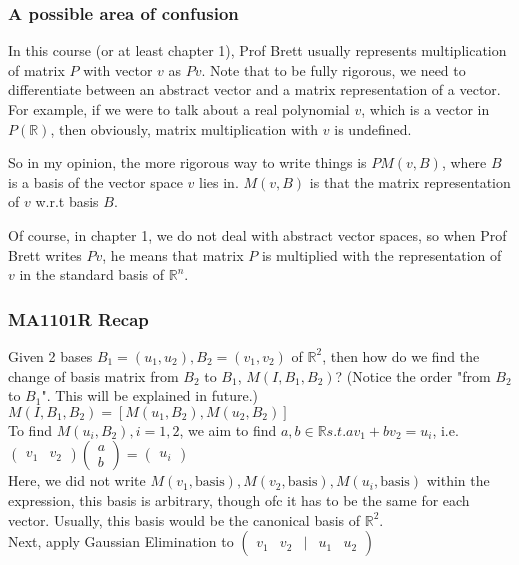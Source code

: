 \documentclass{article}
\begin{document}
\subsubsection{A possible area of confusion}
In this course (or at least chapter 1), Prof Brett usually represents multiplication of matrix $P$ with vector $v$ as $Pv$. Note that to be fully rigorous, we need to differentiate between an abstract vector and a matrix representation of a vector. For example, if we were to talk about a real polynomial $v$, which is a vector in $P(\mathbb{R})$, then obviously, matrix multiplication with $v$ is undefined.

So in my opinion, the more rigorous way to write things is $PM(v, B)$, where $B$ is a basis of the vector space $v$ lies in. $M(v,B)$ is that the matrix representation of $v$ w.r.t basis $B$.

Of course, in chapter 1, we do not deal with abstract vector spaces, so when Prof Brett writes $Pv$, he means that matrix $P$ is multiplied with the representation of $v$ in the standard basis of $\mathbb{R}^n$.

\subsubsection{MA1101R Recap}
Given 2 bases $B_1=(u_1,u_2),B_2=(v_1,v_2)$ of $\mathbb{R}^2$, then how do we find the change of basis matrix from $B_2$ to $B_1$, $M(I, B_1, B_2)$? (Notice the order "from $B_2$ to $B_1$". This will be explained in future.)\\
$M(I, B_1, B_2)=[M(u_1, B_2), M(u_2,B_2)]$\\
To find $M(u_i, B_2), i=1,2$, we aim to find $a,b\in \mathbb{R} s.t. av_1+bv_2=u_i$, i.e. $\begin{pmatrix}
	v_1 & v_2
\end{pmatrix}\begin{pmatrix}
	a\\
	b
\end{pmatrix}=\begin{pmatrix}
	u_i
\end{pmatrix}
$\\
Here, we did not write $M(v_1,\text{basis}),M(v_2,\text{basis}),M(u_i,\text{basis})$ within the expression, this basis is arbitrary, though ofc it has to be the same for each vector. Usually, this basis would be the canonical basis of $\mathbb{R}^2$.\\
Next, apply Gaussian Elimination to $\begin{pmatrix}
	v_1 & v_2 & | & u_1 & u_2
\end{pmatrix}$
\end{document}
